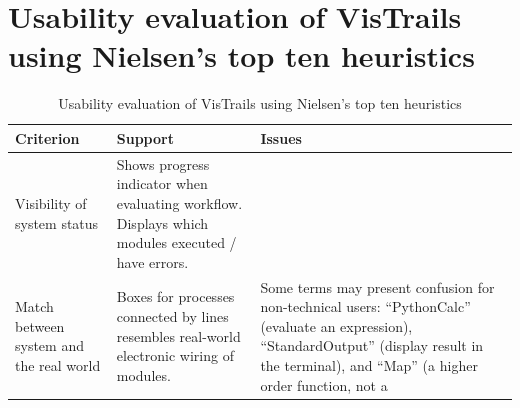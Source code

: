 \clearpage

\section{Usability evaluation of VisTrails using Nielsen's top ten heuristics}

{
\renewcommand{\arraystretch}{1.8} %
\begin{longtable}[c]{@{}lll@{}}
\caption{Usability evaluation of VisTrails using
Nielsen's top ten heuristics \cite{Nielsen1994}}
\label{appendix:tab:EvalUsability}\tabularnewline
\hline
\endhead
\toprule
\begin{minipage}[t]{0.30\columnwidth}\raggedright\strut
{\textbf{Criterion}}
\strut\end{minipage} &
\begin{minipage}[t]{0.30\columnwidth}\raggedright\strut
{\textbf{Support}}
\strut\end{minipage} &
\begin{minipage}[t]{0.30\columnwidth}\raggedright\strut
{\textbf{Issues}}
\strut\end{minipage}\tabularnewline
\midrule
\begin{minipage}[t]{0.30\columnwidth}\raggedright\strut
{Visibility of system status}
\strut\end{minipage} &
\begin{minipage}[t]{0.30\columnwidth}\raggedright\strut
{Shows progress indicator when evaluating workflow. Displays which
modules executed / have errors.}
\strut\end{minipage} &
\begin{minipage}[t]{0.30\columnwidth}\raggedright\strut
{}
\strut\end{minipage}\tabularnewline
\begin{minipage}[t]{0.30\columnwidth}\raggedright\strut
{Match between system and the real world}
\strut\end{minipage} &
\begin{minipage}[t]{0.30\columnwidth}\raggedright\strut
{Boxes for processes connected by lines resembles real-world electronic
wiring of modules.}
\strut\end{minipage} &
\begin{minipage}[t]{0.30\columnwidth}\raggedright\strut
{Some terms may present confusion for non-technical users:
``PythonCalc'' (evaluate an expression), ``StandardOutput'' (display
result in the terminal), and ``Map'' (a higher order function, not a
}
\end{minipage}
\end{longtable}}

